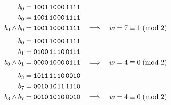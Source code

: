 \begin{align*}
b_{0} &= \texttt{1001\,1000\,1111} \\
b_{0} &= \texttt{1001\,1000\,1111} \\
b_{0}\wedge b_{0} &= \texttt{1001\,1000\,1111} \quad\Longrightarrow\quad w = 7 \equiv 1 \!\pmod 2
\end{align*}
\begin{align*}
b_{0} &= \texttt{1001\,1000\,1111} \\
b_{1} &= \texttt{0100\,1110\,0111} \\
b_{0}\wedge b_{1} &= \texttt{0000\,1000\,0111} \quad\Longrightarrow\quad w = 4 \equiv 0 \!\pmod 2
\end{align*}
\begin{align*}
b_{3} &= \texttt{1011\,1110\,0010} \\
b_{7} &= \texttt{0010\,1011\,1110} \\
b_{3}\wedge b_{7} &= \texttt{0010\,1010\,0010} \quad\Longrightarrow\quad w = 4 \equiv 0 \!\pmod 2
\end{align*}
